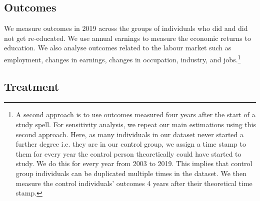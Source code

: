 \documentclass[12pt, a4paper]{article}
\begin{document}
%



\subsection{Outcomes}

We measure outcomes in 2019 across the groups of individuals who did and did not get re-educated. We use annual earnings to measure the economic returns to education. We also analyse outcomes related to the labour market such as employment, changes in earnings, changes in occupation, industry, and jobs.\footnote{A second approach is to use outcomes measured four years after the start of a study spell. For sensitivity analysis, we repeat our main estimations using this second approach. Here, as many individuals in our dataset never started a further degree i.e. they are in our control group, we assign a time stamp to them for every year the control person theoretically could have started to study. We do this for every year from 2003 to 2019. This implies that control group individuals can be duplicated multiple times in the dataset. We then measure the control individuals' outcomes 4 years after their theoretical time stamp.}


\subsection{Treatment}
\end{document}
